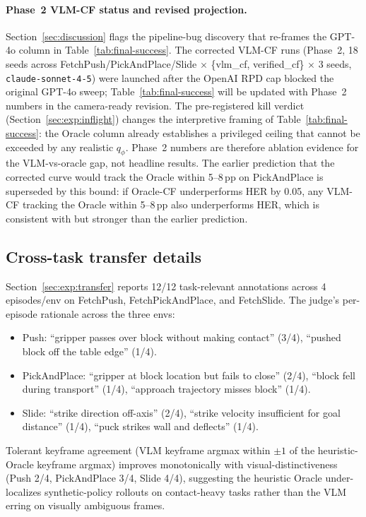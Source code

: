 \paragraph{Phase~2 VLM-CF status and revised projection.}
Section~\ref{sec:discussion} flags the pipeline-bug discovery that
re-frames the GPT-4o column in Table~\ref{tab:final-success}.
The corrected VLM-CF runs (Phase~2, 18 seeds across
FetchPush/PickAndPlace/Slide $\times$ \{vlm\_cf, verified\_cf\} $\times$ 3
seeds, \texttt{claude-sonnet-4-5}) were launched after the OpenAI RPD cap
blocked the original GPT-4o sweep; Table~\ref{tab:final-success} will be
updated with Phase~2 numbers in the camera-ready revision.
The pre-registered kill verdict (Section~\ref{sec:exp:inflight}) changes
the interpretive framing of Table~\ref{tab:final-success}: the Oracle column
already establishes a privileged ceiling that cannot be exceeded by any
realistic $q_\phi$.  Phase~2 numbers are therefore ablation evidence for the
VLM-vs-oracle gap, not headline results.
The earlier prediction that the corrected curve would track the Oracle
within 5--8\,pp on PickAndPlace is superseded by this bound:
if Oracle-CF underperforms HER by 0.05, any VLM-CF tracking the Oracle
within 5--8\,pp also underperforms HER, which is consistent with but
stronger than the earlier prediction.

\subsection{Cross-task transfer details}
\label{app:transfer}

Section~\ref{sec:exp:transfer} reports 12/12 task-relevant annotations
across 4 episodes/env on FetchPush, FetchPickAndPlace, and FetchSlide.
The judge's per-episode rationale across the three envs:
\begin{itemize}\itemsep1pt
\item Push: ``gripper passes over block without making contact'' (3/4),
``pushed block off the table edge'' (1/4).
\item PickAndPlace: ``gripper at block location but fails to close''
(2/4), ``block fell during transport'' (1/4), ``approach trajectory
misses block'' (1/4).
\item Slide: ``strike direction off-axis'' (2/4), ``strike velocity
insufficient for goal distance'' (1/4), ``puck strikes wall and
deflects'' (1/4).
\end{itemize}
Tolerant keyframe agreement (VLM keyframe argmax within $\pm 1$ of the
heuristic-Oracle keyframe argmax) improves monotonically with
visual-distinctiveness (Push 2/4, PickAndPlace 3/4, Slide 4/4),
suggesting the heuristic Oracle under-localizes synthetic-policy
rollouts on contact-heavy tasks rather than the VLM erring on visually
ambiguous frames.


